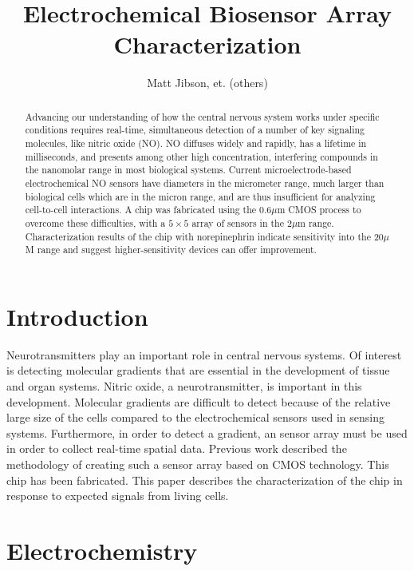 \documentclass{article}
\begin{document}
\title{Electrochemical Biosensor Array Characterization}
\author{Matt Jibson, et. (others)}

\maketitle{}

\begin{abstract}

Advancing our understanding of how the central nervous system works under specific conditions requires real-time, simultaneous detection of a number of key signaling molecules, like nitric oxide (NO). NO diffuses widely and rapidly, has a lifetime in milliseconds, and presents among other high concentration, interfering compounds in the nanomolar range in most biological systems. Current microelectrode-based electrochemical NO sensors have diameters in the micrometer range, much larger than biological cells which are in the micron range, and are thus insufficient for analyzing cell-to-cell interactions. A chip was fabricated using the 0.6$\mu$m CMOS process to overcome these difficulties, with a $5 \times 5$ array of sensors in the 2$\mu$m range. Characterization results of the chip with norepinephrin indicate sensitivity into the 20$\mu$M range and suggest higher-sensitivity devices can offer improvement.

\end{abstract}

\section{Introduction}

Neurotransmitters play an important role in central nervous systems. Of interest is detecting molecular gradients that are essential in the development of tissue and organ systems. Nitric oxide, a neurotransmitter, is important in this development. Molecular gradients are difficult to detect because of the relative large size of the cells compared to the electrochemical sensors used in sensing systems. Furthermore, in order to detect a gradient, an sensor array must be used in order to collect real-time spatial data. Previous work described the methodology of creating such a sensor array based on CMOS technology. This chip has been fabricated. This paper describes the characterization of the chip in response to expected signals from living cells.

\section{Electrochemistry}
\end{document}

